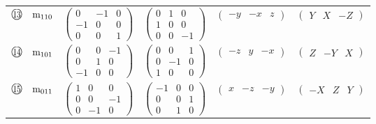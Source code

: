 \documentclass[fleqn,10pt,landscape]{jsarticle}
\begin{document}
\begin{center}
\begin{longtable}{lcccc}
$ {\ooalign{\hfil\resizebox{.8\width}{\height}{13}\hfil\crcr\raise.1ex\hbox{\large$\bigcirc$}}}\quad {\rm m}_{110} $ & $ \begin{pmatrix} 0 & -1 & 0 \\ -1 & 0 & 0 \\ 0 & 0 & 1 \end{pmatrix} $ & $ \begin{pmatrix} 0 & 1 & 0 \\ 1 & 0 & 0 \\ 0 & 0 & -1 \end{pmatrix} $ & $ \begin{pmatrix} - y & - x & z \end{pmatrix} $ & $ \begin{pmatrix} Y & X & - Z \end{pmatrix} $ \\
$ {\ooalign{\hfil\resizebox{.8\width}{\height}{14}\hfil\crcr\raise.1ex\hbox{\large$\bigcirc$}}}\quad {\rm m}_{101} $ & $ \begin{pmatrix} 0 & 0 & -1 \\ 0 & 1 & 0 \\ -1 & 0 & 0 \end{pmatrix} $ & $ \begin{pmatrix} 0 & 0 & 1 \\ 0 & -1 & 0 \\ 1 & 0 & 0 \end{pmatrix} $ & $ \begin{pmatrix} - z & y & - x \end{pmatrix} $ & $ \begin{pmatrix} Z & - Y & X \end{pmatrix} $ \\
$ {\ooalign{\hfil\resizebox{.8\width}{\height}{15}\hfil\crcr\raise.1ex\hbox{\large$\bigcirc$}}}\quad {\rm m}_{011} $ & $ \begin{pmatrix} 1 & 0 & 0 \\ 0 & 0 & -1 \\ 0 & -1 & 0 \end{pmatrix} $ & $ \begin{pmatrix} -1 & 0 & 0 \\ 0 & 0 & 1 \\ 0 & 1 & 0 \end{pmatrix} $ & $ \begin{pmatrix} x & - z & - y \end{pmatrix} $ & $ \begin{pmatrix} - X & Z & Y \end{pmatrix} $ \\

\end{longtable}
\end{center}
\end{document}
